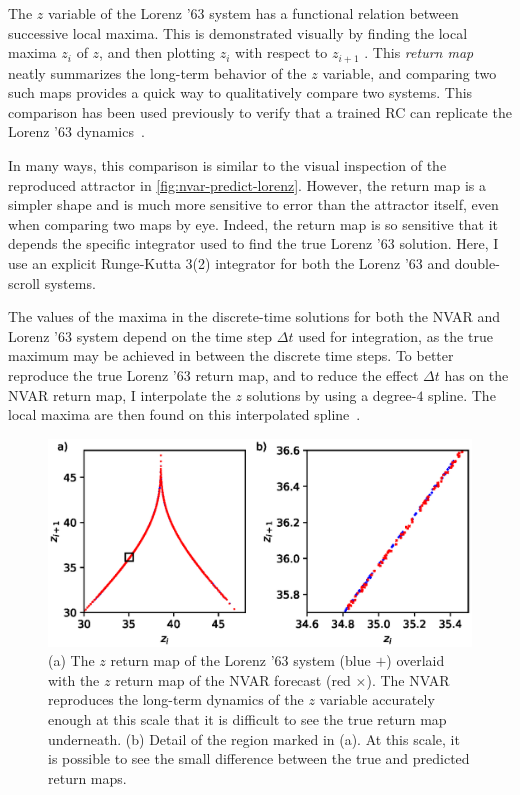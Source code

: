 The $z$ variable of the Lorenz '63 system has a functional relation
between successive local maxima. This is demonstrated visually by
finding the local maxima $z_i$ of $z$, and then plotting $z_i$ with
respect to $z_{i+1}$ \cite{lorenz1963}. This \emph{return map} neatly
summarizes the long-term behavior of the $z$ variable, and comparing
two such maps provides a quick way to qualitatively compare two
systems. This comparison has been used previously to verify that a
trained RC can replicate the Lorenz '63 dynamics~\cite{pathak2017}.

In many ways, this comparison is similar to the visual inspection of the
reproduced attractor in \cref{fig:nvar-predict-lorenz}. However, the
return map is a simpler shape and is much more sensitive to error
than the attractor itself, even when comparing two maps by eye. Indeed,
the return map is so sensitive that it depends the specific integrator
used to find the true Lorenz '63 solution. Here, I use an explicit
Runge-Kutta 3(2)\cite{dormand1980} integrator for both the Lorenz '63
and double-scroll systems.

The values of the maxima in the discrete-time solutions for both the
NVAR and Lorenz '63 system depend on the time step $\Delta t$ used for
integration, as the true maximum may be achieved in between the
discrete time steps. To better reproduce the true Lorenz '63 return
map, and to reduce the effect $\Delta t$ has on the NVAR return map,
I interpolate the $z$ solutions by using a degree-$4$ spline. The
local maxima are then found on this interpolated spline~\cite{dierckx1995}.

\begin{figure}
  \includegraphics{figures/nvar-lorenz-rmap}
  \caption{(a) The $z$ return map of the Lorenz '63 system (blue $+$)
    overlaid with the $z$ return map of the NVAR forecast (red
    $\times$). The NVAR reproduces the long-term dynamics of the $z$
    variable accurately enough at this scale that it is difficult to
    see the true return map underneath. (b) Detail of the region
    marked in (a). At this scale, it is possible to see the small
    difference between the true and predicted return maps.}
  \label{fig:nvar-lorenz-rmap}
\end{figure}

